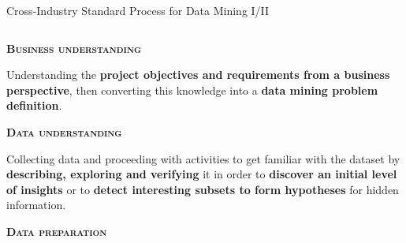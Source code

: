 \documentclass[main.tex]{subfiles}
\begin{document}
    \begin{frame}{Cross-Industry Standard Process for Data Mining I/II}
        \begin{columns}
            \begin{column}{.6\textwidth}
                \begin{justify}
                    \alert{\textbf{\textsc{Business understanding}}}
                    
                    Understanding the \textbf{project objectives and requirements from a business perspective}, then converting this knowledge into a \textbf{data mining problem definition}.
                    \vspace*{2mm}
                    
                    \alert{\textbf{\textsc{Data understanding}}}
                    
                    Collecting data and proceeding with activities to get familiar with the dataset by \textbf{describing, exploring and verifying} it in order to\textbf{ discover an initial level of insights} or to \textbf{detect interesting subsets to form hypotheses} for hidden information.
                    \vspace*{2mm}
                    
                    \alert{\textbf{\textsc{Data preparation}}}
                    

\end{justify}
\end{column}
\end{columns}
\end{frame}
\end{document}
